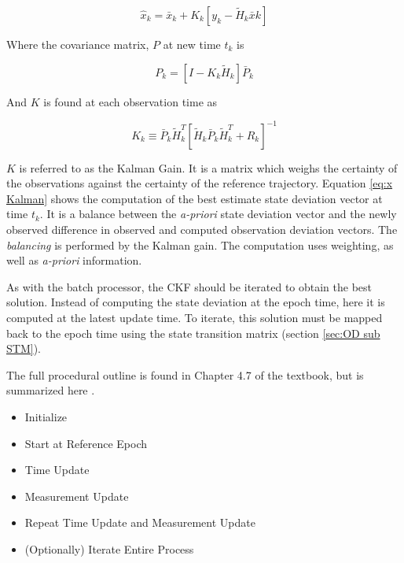 \documentclass[12pt,a4paper,oneside]{article}
\numberwithin{equation}{section}   		%
\begin{document}
\begin{equation}
	\hat{x}_k = \bar{x}_k + K_k [ y_k - \tilde{H}_k \bar{x}k ]
	\label{eq:x Kalman}
\end{equation}

Where the covariance matrix, $P$ at new time $t_k$ is

\begin{equation}
	P_k = [I - K_k \tilde{H}_k] \bar{P}_k
	\label{eq:P Kalman}
\end{equation}

And $K$ is found at each observation time as

\begin{equation}
	K_k \equiv \bar{P}_k \tilde{H}_k^T [ \tilde{H}_k \bar{P}_k \tilde{H}_k^T + R_k]^{-1}
	\label{eq:K Kalman}
\end{equation}

$K$ is referred to as the Kalman Gain. It is a matrix which weighs the certainty of the observations against the certainty of the reference trajectory. Equation \eqref{eq:x Kalman} shows the computation of the best estimate state deviation vector at time $t_k$. It is a balance between the \emph{a-priori} state deviation vector and the newly observed difference in observed and computed observation deviation vectors. The \emph{balancing} is performed by the Kalman gain. The computation uses weighting, as well as \emph{a-priori} information. 

As with the batch processor, the CKF should be iterated to obtain the best solution. Instead of computing the state deviation at the epoch time, here it is computed at the latest update time. To iterate, this solution must be mapped back to the epoch time using the state transition matrix (section \ref{sec:OD sub STM}).

The full procedural outline is found in Chapter 4.7 of the textbook, but is summarized here \cite{5070LEC11}.


\begin{itemize}
	\renewcommand{\labelitemi}{$\bullet$}
	\renewcommand{\labelitemii}{$\dash$}
	\item Initialize
	\item Start at Reference Epoch
	\item Time Update
	\item Measurement Update
	\item Repeat Time Update and Measurement Update
	\item (Optionally) Iterate Entire Process
\end{itemize}
\end{document}
